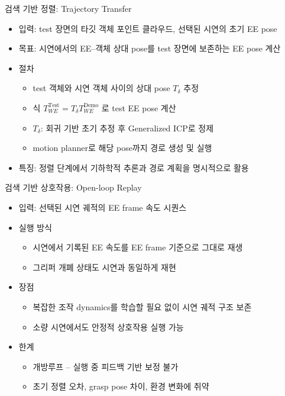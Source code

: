 \documentclass[aspectratio=169]{beamer}
\begin{document}
\begin{frame}{검색 기반 정렬: Trajectory Transfer}
  \small
  \begin{itemize}
    \item 입력: test 장면의 타깃 객체 포인트 클라우드, 선택된 시연의 초기 EE pose
    \item 목표: 시연에서의 EE–객체 상대 pose를 test 장면에 보존하는 EE pose 계산
    \item 절차
    \begin{itemize}
      \item test 객체와 시연 객체 사이의 상대 pose $T_\delta$ 추정
      \item 식 $T^{\text{Test}}_{WE} = T_\delta T^{\text{Demo}}_{WE}$ 로 test EE pose 계산
      \item $T_\delta$: 회귀 기반 초기 추정 후 Generalized ICP로 정제
      \item motion planner로 해당 pose까지 경로 생성 및 실행
    \end{itemize}
    \item 특징: 정렬 단계에서 기하학적 추론과 경로 계획을 명시적으로 활용
  \end{itemize}
\end{frame}

\begin{frame}{검색 기반 상호작용: Open-loop Replay}
  \small
  \begin{itemize}
    \item 입력: 선택된 시연 궤적의 EE frame 속도 시퀀스
    \item 실행 방식
    \begin{itemize}
      \item 시연에서 기록된 EE 속도를 EE frame 기준으로 그대로 재생
      \item 그리퍼 개폐 상태도 시연과 동일하게 재현
    \end{itemize}
    \item 장점
    \begin{itemize}
      \item 복잡한 조작 dynamics를 학습할 필요 없이 시연 궤적 구조 보존
      \item 소량 시연에서도 안정적 상호작용 실행 가능
    \end{itemize}
    \item 한계
    \begin{itemize}
      \item 개방루프 – 실행 중 피드백 기반 보정 불가
      \item 초기 정렬 오차, grasp pose 차이, 환경 변화에 취약
    \end{itemize}
  \end{itemize}
\end{frame}
\end{document}
